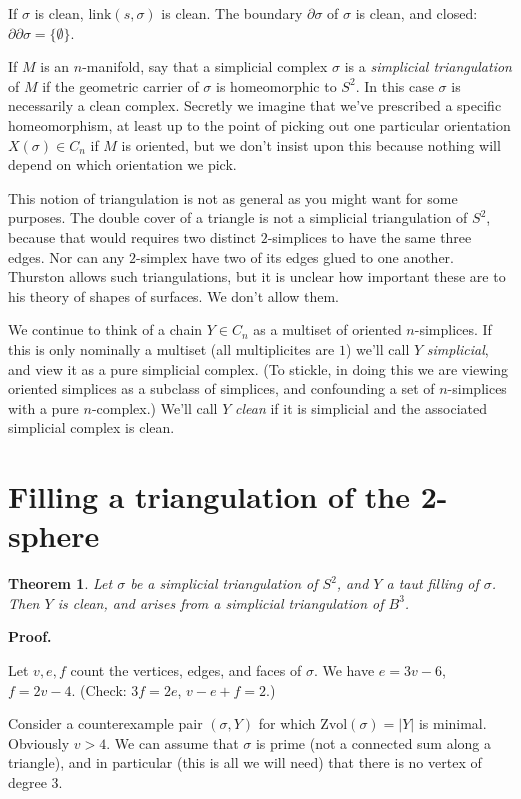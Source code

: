 \documentclass[12pt]{article}
\newtheorem{theorem}{Theorem}
\newcommand{\proofstart}{{\noindent \bf Proof.\ }}
\def\del{\partial}
\newcommand{\kw}{\mathrm}
\newcommand{\link}{\kw{link}}
\newcommand{\Zvol}{\kw{Zvol}}
\begin{document}
If $\sigma$ is clean, 
$\link(s,\sigma)$ is clean.
The boundary $\del \sigma$ of $\sigma$ is clean,
and closed:
$\del \del \sigma = \{\emptyset\}$.

If $M$ is an $n$-manifold,
say that a simplicial complex $\sigma$
is a \emph{simplicial triangulation} of $M$
if the geometric carrier of $\sigma$ is homeomorphic to $S^2$.
In this case $\sigma$ is necessarily a clean complex.
Secretly we imagine that we've prescribed a specific homeomorphism,
at least up to the point of picking out one particular orientation
$X(\sigma) \in C_n$ if $M$ is oriented,
but we don't insist upon this because nothing will depend on which
orientation we pick.

This notion of triangulation is not as general as you might want
for some purposes.
The double cover of a triangle is not a simplicial triangulation
of $S^2$,
because that would requires two distinct
$2$-simplices to have the same three edges.
Nor can any $2$-simplex have two of its edges
glued to one another.
Thurston
\cite{thurston:shapes}
allows such triangulations,
but it is unclear how important these are to
his theory of shapes of surfaces.
We don't allow them.

We continue to think of a chain $Y \in C_n$ as a multiset of
oriented $n$-simplices.
If this is only nominally a multiset (all multiplicites are $1$)
we'll call $Y$ \emph{simplicial},
and view it as a pure simplicial complex.
(To stickle, in doing this
we are viewing oriented simplices as a subclass of simplices,
and confounding a set of $n$-simplices with a pure $n$-complex.)
We'll call $Y$ \emph{clean} if it is simplicial
and the associated simplicial complex is clean.

\section{Filling a triangulation of the 2-sphere}

\begin{theorem} \label{th2}
Let $\sigma$ be a simplicial triangulation of $S^2$,
and $Y$ a taut filling of $\sigma$.
Then $Y$ is clean, and arises from
a simplicial triangulation of $B^3$.
\end{theorem}

\proofstart

Let $v,e,f$  count the vertices, edges, and faces of $\sigma$.
We have
$e=3v-6$, $f=2v-4$.
(Check: $3f=2e$, $v-e+f=2$.)

Consider a counterexample pair $(\sigma,Y)$ for which
$\Zvol(\sigma)=|Y|$ is minimal.
Obviously $v>4$.
We can assume that $\sigma$ is prime
(not a connected sum along a triangle),
and in particular (this is all we will need) that there is no
vertex of degree $3$.
\end{document}
